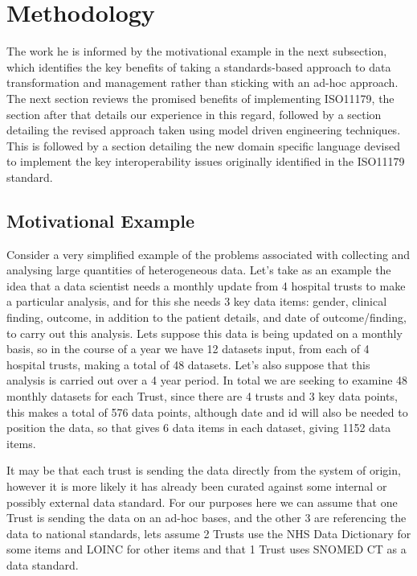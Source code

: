 \documentclass[runningheads]{llncs}
\begin{document}
	\FloatBarrier

\section{Methodology}
The work he is informed by the motivational example in the next subsection, which identifies the key benefits of taking a standards-based approach to data transformation and management rather than sticking with an ad-hoc approach. The next section reviews the promised benefits of implementing ISO11179, the section after that details our experience in this regard, followed by a section detailing the revised approach taken using model driven engineering techniques. This is followed by a section detailing the new domain specific language devised to implement the key interoperability issues originally identified in the ISO11179 standard.

\subsection{Motivational Example}
Consider a very simplified example of the problems associated with collecting and analysing large quantities of heterogeneous data. Let's take as an example the idea that a data scientist needs a monthly update from 4 hospital trusts to make a particular analysis, and for this she needs 3 key data items: gender, clinical finding, outcome, in addition to the patient details, and date of outcome/finding, to carry out this analysis. Lets suppose this data is being updated on a monthly basis, so in the course of a year we have 12 datasets input, from each of 4 hospital trusts, making a total of 48 datasets. Let's also suppose that this analysis is carried out over a 4 year period. In total we are seeking to examine 48 monthly datasets for each Trust, since there are 4 trusts and 3 key data points, this makes a total of 576 data points, although date and id will also be needed to position the data, so that gives 6 data items in each dataset, giving 1152 data items. 

It may be that each trust is sending the data directly from the system of origin, however it is more likely it has already been curated against some internal or possibly external data standard. For our purposes here we can assume that one Trust is sending the data on an ad-hoc bases, and the other 3 are referencing the data to national standards, lets assume 2 Trusts use the NHS Data Dictionary for some items and LOINC for other items and that 1 Trust uses SNOMED CT as a data standard.
\end{document}
